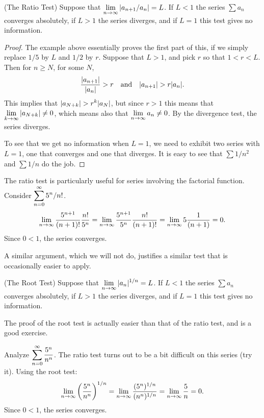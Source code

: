 \begin{theorem} (The Ratio Test)
Suppose that $\displaystyle\lim_{n\to \infty} |a_{n+1}/a_n|=L$. If $L<1$
the series $\sum a_n$ converges absolutely, 
if $L>1$ the series diverges, and if
$L=1$ this test gives no information.
\end{theorem}

\begin{proof}
The example above essentially proves the first part of this, if we
simply replace $1/5$ by $L$ and $1/2$ by $r$. 
Suppose that $L>1$, and pick $r$ so that $1<r<L$.
Then for $n\ge N$, for some $N$,
$${|a_{n+1}|\over |a_n|} > r \hbox{\quad and\quad} |a_{n+1}| > r|a_n|.$$
This implies that $\ds |a_{N+k}|>r^k|a_N|$, but since $r>1$ this means
that $\displaystyle\lim_{k\to\infty}|a_{N+k}|\not=0$, which means also that
$\displaystyle\lim_{n\to\infty}a_n\not=0$. By the divergence test, the series
diverges. 

To see that we get no information when $L=1$, we need to exhibit two
series with $L=1$, one that converges and one that diverges. It is
easy to see that $\sum 1/n^2$ and $\sum 1/n$ do the job.
\end{proof}

\begin{example} The ratio test is particularly useful for series involving
the factorial function. Consider $\displaystyle\sum_{n=0}^\infty  5^n/n!$. 
$$
  \lim_{n\to\infty} {5^{n+1}\over (n+1)!}{n!\over 5^n}=
  \lim_{n\to\infty} {5^{n+1}\over 5^n}{n!\over (n+1)!}=
  \lim_{n\to\infty} {5}{1\over (n+1)}=0.
$$
Since $0<1$, the series converges.
\end{example}

A similar argument, which we will not do, justifies a similar test
that is occasionally easier to apply. 

\begin{theorem} (The Root Test) 
\label{thm:root test}
Suppose that $\displaystyle\lim_{n\to \infty} |a_n|^{1/n}=L$. If $L<1$
the series $\sum a_n$ converges absolutely, 
if $L>1$ the series diverges, and if
$L=1$ this test gives no information.
\end{theorem}

The proof of the root test is actually easier than that of the ratio
test, and is a good exercise.

\begin{example} Analyze $\displaystyle\sum_{n=0}^\infty {5^n\over n^n}$.
\ssk
The ratio test turns out to be a bit difficult on this series (try
it). Using the root test:
$$
  \lim_{n\to\infty} \left({5^n\over n^n}\right)^{1/n}=
  \lim_{n\to\infty} {(5^n)^{1/n}\over (n^n)^{1/n}}=
  \lim_{n\to\infty} {5\over n}=0.
$$
Since $0<1$, the series converges.
\end{example}

